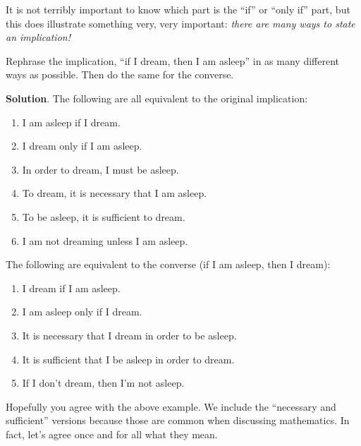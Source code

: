 \documentclass[11pt,]{book}
\theoremstyle{ptxplainnotitle}
\theoremstyle{ptxplaintitle}
\theoremstyle{ptxdefinitionnotitle}
\theoremstyle{ptxdefinitiontitle}
\theoremstyle{ptxdefinitionnotitle}
\theoremstyle{ptxdefinitiontitle}
\theoremstyle{ptxdefinitionnotitle}
\theoremstyle{ptxdefinitiontitle}
\theoremstyle{ptxdefinitiontitlenonumber}
\theoremstyle{ptxdefinitiontitlenonumber}
\numberwithin{equation}{chapter}
\begin{document}
\hypertarget{p-1863}{}%
It is not terribly important to know which part is the ``if'' or ``only if'' part, but this does illustrate something very, very important: \emph{there are many ways to state an implication!}%
\begin{example}\label{example-54}
\hypertarget{p-1864}{}%
Rephrase the implication, ``if I dream, then I am asleep'' in as many different ways as possible. Then do the same for the converse.%
\par\smallskip%
\noindent\textbf{Solution}.\hypertarget{solution-235}{}\quad%
\hypertarget{p-1865}{}%
The following are all equivalent to the original implication: \leavevmode%
\begin{enumerate}
\item\hypertarget{li-791}{}\hypertarget{p-1866}{}%
I am asleep if I dream.%
\item\hypertarget{li-792}{}\hypertarget{p-1867}{}%
I dream only if I am asleep.%
\item\hypertarget{li-793}{}\hypertarget{p-1868}{}%
In order to dream, I must be asleep.%
\item\hypertarget{li-794}{}\hypertarget{p-1869}{}%
To dream, it is necessary that I am asleep.%
\item\hypertarget{li-795}{}\hypertarget{p-1870}{}%
To be asleep, it is sufficient to dream.%
\item\hypertarget{li-796}{}\hypertarget{p-1871}{}%
I am not dreaming unless I am asleep.%
\end{enumerate}
 The following are equivalent to the converse (if I am asleep, then I dream): \leavevmode%
\begin{enumerate}
\item\hypertarget{li-797}{}\hypertarget{p-1872}{}%
I dream if I am asleep.%
\item\hypertarget{li-798}{}\hypertarget{p-1873}{}%
I am asleep only if I dream.%
\item\hypertarget{li-799}{}\hypertarget{p-1874}{}%
It is necessary that I dream in order to be asleep.%
\item\hypertarget{li-800}{}\hypertarget{p-1875}{}%
It is sufficient that I be asleep in order to dream.%
\item\hypertarget{li-801}{}\hypertarget{p-1876}{}%
If I don't dream, then I'm not asleep.%
\end{enumerate}
%
\end{example}
\hypertarget{p-1877}{}%
Hopefully you agree with the above example. We include the ``necessary and sufficient'' versions because those are common when discussing mathematics. In fact, let's agree once and for all what they mean.%
\end{document}
